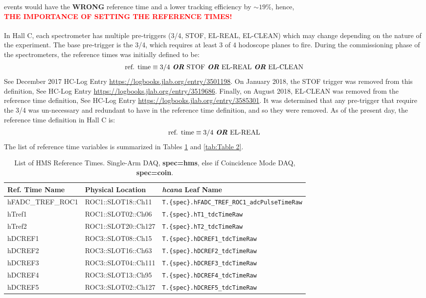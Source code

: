 \documentclass[14pt]{article}
\begin{document}
events would have the \textbf{WRONG} reference time and a lower tracking efficiency by $\sim 19\%$, hence, \\ \textbf{\textcolor{red}{THE IMPORTANCE OF SETTING THE REFERENCE TIMES!}}
\\ \\
\indent In Hall C, each spectrometer has multiple pre-triggers (3/4, STOF, EL-REAL, EL-CLEAN) which may change depending on the nature of the experiment.
The base pre-trigger is the 3/4, which requires at least 3 of 4 hodoscope planes to fire. During the commissioning phase of the spectrometers, the
reference times was initially defined to be:
\begin{align}
 \text{ref. time} \equiv 3/4 \textit{ \textbf{OR} } \text{STOF} \textit{ \textbf{OR} } \text{EL-REAL} \textit{ \textbf{OR} } \text{EL-CLEAN}
\end{align}
See December 2017 HC-Log Entry \url{https://logbooks.jlab.org/entry/3501198}.  On January 2018, the STOF trigger was removed from this definition,
See HC-Log Entry \url{https://logbooks.jlab.org/entry/3519686}. Finally, on August 2018, EL-CLEAN was removed from the reference time definition, See
HC-Log Entry \url{https://logbooks.jlab.org/entry/3585301}. It was determined that any pre-trigger that require the 3/4 was un-necessary and redundant
to have in the reference time definition, and so they were removed. As of the present day, the reference time definition in Hall C is:
\begin{align}
 \text{ref. time} \equiv 3/4 \textit{ \textbf{OR} } \text{EL-REAL} 
\end{align}
The list of reference time variables is summarized in Tables \ref{tab:Table 1} and \ref{tab:Table 2}.
\begin{table}[h!]
\begin{tabular}{l l l}
Ref. Time Name               & Physical Location & \textit{hcana} Leaf Name  \\
\hline
hFADC\_TREF\_ROC1 & ROC1::SLOT18::Ch11 & \texttt{T.\{spec\}.hFADC\_TREF\_ROC1\_adcPulseTimeRaw}    \\
hTref1            & ROC1::SLOT02::Ch06 & \texttt{T.\{spec\}.hT1\_tdcTimeRaw} \\
hTref2            & ROC1::SLOT20::Ch127 & \texttt{T.\{spec\}.hT2\_tdcTimeRaw} \\
hDCREF1           & ROC3::SLOT08::Ch15 & \texttt{T.\{spec\}.hDCREF1\_tdcTimeRaw} \\
hDCREF2           & ROC3::SLOT16::Ch63 & \texttt{T.\{spec\}.hDCREF2\_tdcTimeRaw} \\
hDCREF3           & ROC3::SLOT04::Ch111 & \texttt{T.\{spec\}.hDCREF3\_tdcTimeRaw} \\
hDCREF4           & ROC3::SLOT13::Ch95 & \texttt{T.\{spec\}.hDCREF4\_tdcTimeRaw} \\
hDCREF5\footnotemark[3]          & ROC3::SLOT02::Ch127 & \texttt{T.\{spec\}.hDCREF5\_tdcTimeRaw} \\

\end{tabular}
\caption{List of HMS Reference Times. Single-Arm DAQ, \textbf{spec=hms}, else if Coincidence Mode DAQ, \textbf{spec=coin}.}
\label{tab:Table 1}
\end{table}
\end{document}
